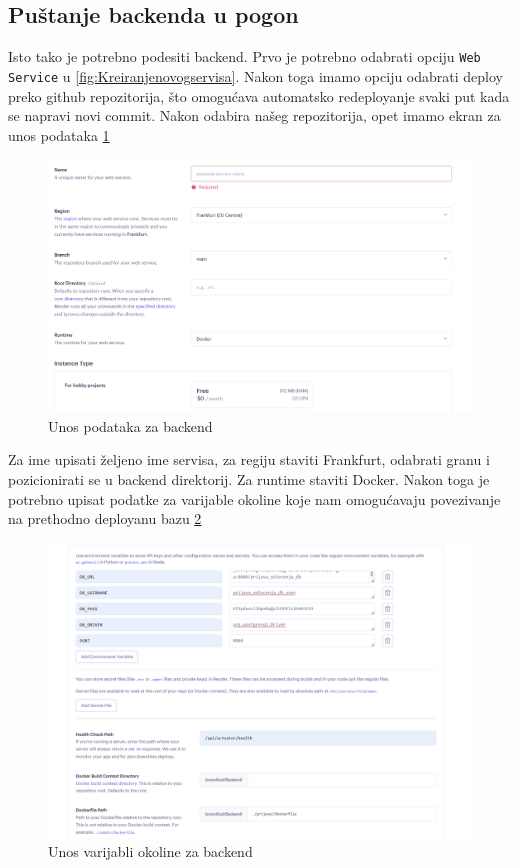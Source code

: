 			\subsection{Puštanje backenda u pogon} 
			Isto tako je potrebno podesiti backend. Prvo je potrebno odabrati opciju \texttt{Web Service} u \ref{fig:Kreiranjenovogservisa}.
			Nakon toga imamo opciju odabrati deploy preko github repozitorija, što omogućava automatsko redeployanje svaki put kada se napravi novi commit.
			Nakon odabira našeg repozitorija, opet imamo ekran za unos podataka \ref{fig:UnosPodatakaZaBack}
			\begin{figure}[H]
				\includegraphics[scale=0.40]{slike/render3.png} %
				\centering
				\caption{Unos podataka za backend}
				\label{fig:UnosPodatakaZaBack}
			\end{figure}
			Za ime upisati željeno ime servisa, za regiju staviti Frankfurt, odabrati granu i pozicionirati se u backend direktorij. Za runtime staviti Docker.
			Nakon toga je potrebno upisat podatke za varijable okoline koje nam omogućavaju povezivanje na prethodno deployanu bazu \ref{fig:EnvVarijable}
			\begin{figure}[H]
				\includegraphics[scale=0.40]{slike/render4.png} %
				\centering
				\caption{Unos varijabli okoline za backend}
				\label{fig:EnvVarijable}
			\end{figure}

